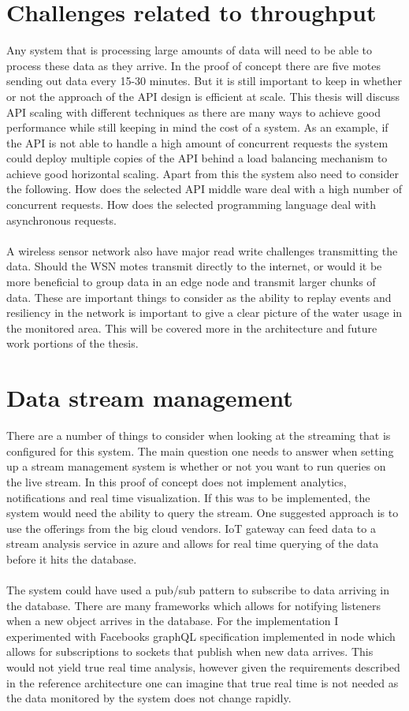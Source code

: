 \documentclass[]{uiophd}
\begin{document}
\section{Challenges related to throughput}

Any system that is processing large amounts of data will need to be able to process these data as they arrive. In the proof of concept there are five motes sending out data every 15-30 minutes. But it is still important to keep in whether or not the approach of the API design is efficient at scale. This thesis will discuss API scaling with different techniques as there are many ways to achieve good performance while still keeping in mind the cost of a system. As an example, if the API is not able to handle a high amount of concurrent requests the system could deploy multiple copies of the API behind a load balancing mechanism to achieve good horizontal scaling. Apart from this the system also need to consider the following. How does the selected API middle ware deal with a high number of concurrent requests. How does the selected programming language deal with asynchronous requests.
\\\\
A wireless sensor network also have major read write challenges transmitting the data. Should the WSN motes transmit directly to the internet, or would it be more beneficial to group data in an edge node and transmit larger chunks of data. These are important things to consider as the ability to replay events and resiliency in the network is important to give a clear picture of the water usage in the monitored area. This will be covered more in the architecture and future work portions of the thesis.

\section{Data stream management}
There are a number of things to consider when looking at the streaming that is configured for this system. The main question one needs to answer when setting up a stream management system is whether or not you want to run queries on the live stream. In this proof of concept does not implement analytics, notifications and real time visualization. If this was to be implemented, the system would need the ability to query the stream. One suggested approach is to use the offerings from the big cloud vendors. IoT gateway can feed data to a stream analysis service in azure and allows for real time querying of the data before it hits the database.
\\\\
The system could have used a pub/sub pattern to subscribe to data arriving in the database. There are many frameworks which allows for notifying listeners when a new object arrives in the database. For the implementation I experimented with Facebooks graphQL specification implemented in node which allows for subscriptions to sockets that publish when new data arrives. This would not yield true real time analysis, however given the requirements described in the reference architecture one can imagine that true real time is not needed as the data monitored by the system does not change rapidly.
\end{document}
